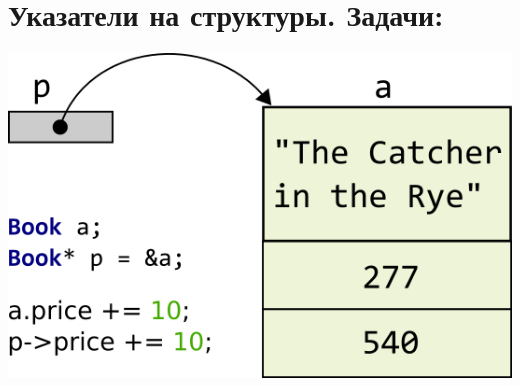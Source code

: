 \documentclass{article}
\begin{document}
\section*{Указатели на структуры. Задачи:}

\begin{center}
\includegraphics[scale=0.7]{../images/structpointer.png}
\end{center}
\end{document}
